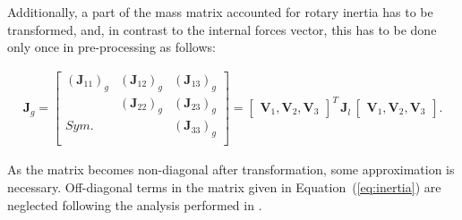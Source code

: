 Additionally, a part of the mass matrix accounted for rotary inertia has to be transformed, and, in contrast to the internal forces vector, this has to be done only once in pre-processing as follows:

\begin{eqnarray}
	\textbf{J}_g=\left [ 
	\begin{array}{ccc}
		\left (\textbf{J}_{11}\right )_g & \left (\textbf{J}_{12}\right )_g & \left (\textbf{J}_{13}\right )_g\\
		& \left (\textbf{J}_{22}\right )_g & \left (\textbf{J}_{23}\right )_g\\
		Sym. &  & \left (\textbf{J}_{33}\right )_g\\
	\end{array}
	\right ]
	=\left[\begin{array}{ccc}
		\textbf{V}_1, \textbf{V}_2, \textbf{V}_3 \end{array}\right ]^T
	\,\textbf{J}_l\,
	\left[\begin{array}{ccc}
		\textbf{V}_1, \textbf{V}_2, \textbf{V}_3 \end{array}\right ].
	\label{eq:inertia}
\end{eqnarray}

As the matrix becomes non-diagonal after transformation, some approximation is necessary.
Off-diagonal terms in the matrix given in Equation~(\ref{eq:inertia}) are neglected following the analysis performed in \cite{surana1980transition}.
